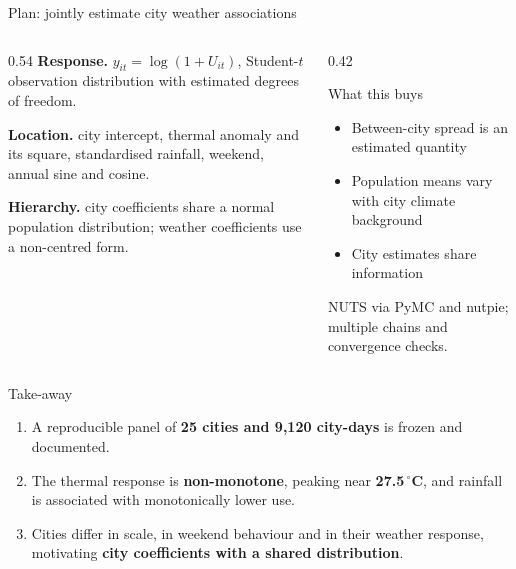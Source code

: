 \documentclass[aspectratio=169,11pt]{beamer}
\newcommand{\hl}[1]{{\color{csPurple}\bfseries #1}}
\newcommand{\hlg}[1]{{\color{csGold}\bfseries #1}}
\begin{document}
\begin{frame}{Plan: jointly estimate city weather associations}
  \small
  \begin{columns}[T,onlytextwidth]
    \begin{column}{0.54\textwidth}
      \textbf{Response.} $y_{it}=\log(1+U_{it})$, Student-$t$ observation
      distribution with estimated degrees of freedom.

      \vspace{0.24cm}
      \textbf{Location.} city intercept, thermal anomaly and its square,
      standardised rainfall, weekend, annual sine and cosine.

      \vspace{0.24cm}
      \textbf{Hierarchy.} city coefficients share a normal population
      distribution; weather coefficients use a non-centred form.
    \end{column}
    \begin{column}{0.42\textwidth}
      \begin{block}{What this buys}
        \begin{itemize}
          \item Between-city spread is an estimated quantity
          \item Population means vary with city climate background
          \item City estimates share information
        \end{itemize}
      \end{block}
      \vspace{0.18cm}
      \footnotesize NUTS via PyMC and nutpie; multiple chains and convergence checks.
    \end{column}
  \end{columns}
\end{frame}

\begin{frame}{Take-away}
  \vspace{0.24cm}
  \begin{enumerate}
    \setlength{\itemsep}{0.52cm}
    \item A reproducible panel of \hl{25 cities and 9{,}120 city-days} is frozen
      and documented.
    \item The thermal response is \hl{non-monotone}, peaking near
      \hlg{27.5\,$^\circ$C}, and rainfall is associated with monotonically lower use.
    \item Cities differ in scale, in weekend behaviour and in their weather
      response, motivating \hl{city coefficients with a shared distribution}.
  \end{enumerate}
  \vspace{0.60cm}
  \centering \hl{Questions}
\end{frame}
\end{document}
